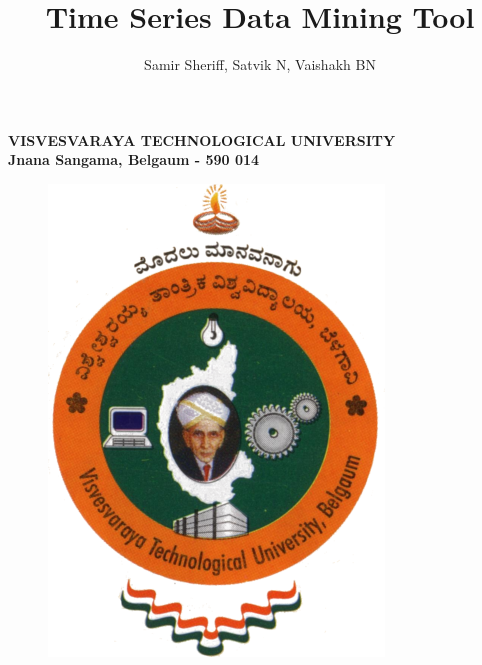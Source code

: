 \documentclass[12pt,a4paper]{report}
\title{Time Series Data Mining Tool}
\author{Samir Sheriff, Satvik N, Vaishakh BN}
\begin{document}
%

\maketitle

\begin{center}
\textbf{\large{VISVESVARAYA TECHNOLOGICAL UNIVERSITY}}\\
\vspace{1.5mm}
\textbf{\large{Jnana Sangama, Belgaum - 590 014}}\\
\end{center}
\vspace{5mm}
\begin{figure} [!h]
\begin{center}
	\includegraphics[scale=0.15]{vtu.png}	
\end{center}
\end{figure}
\end{document}
